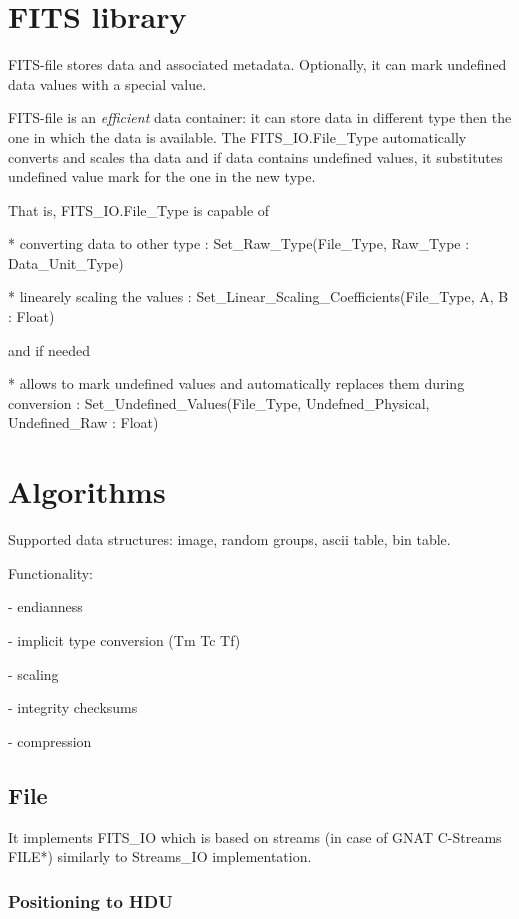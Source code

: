 \documentclass[a4paper,10pt]{article}
\begin{document}
\tableofcontents

\section{FITS library}

FITS-file stores data and associated metadata. Optionally, it can mark undefined
data values with a special value.

FITS-file is an \textit{efficient} data container:
it can store data in different type then the one in which the data is available.
The FITS\_IO.File\_Type automatically converts and scales tha data and if data
contains undefined values, it substitutes undefined value mark for the one in the new type.


That is, FITS\_IO.File\_Type is capable of

* converting data to other type : Set\_Raw\_Type(File\_Type, Raw\_Type : Data\_Unit\_Type)

* linearely scaling the values : Set\_Linear\_Scaling\_Coefficients(File\_Type, A, B : Float)

and if needed

* allows to mark undefined values and automatically replaces them during conversion
: Set\_Undefined\_Values(File\_Type, Undefned\_Physical, Undefined\_Raw : Float)



\section{Algorithms}

Supported data structures: image, random groups, ascii table, bin table.

Functionality:

- endianness

- implicit type conversion (Tm Tc Tf)

- scaling

- integrity checksums

- compression



\subsection{File}
It implements FITS\_IO which is based on streams (in case of GNAT C-Streams FILE*) similarly to Streams\_IO implementation.



\subsubsection{Positioning to HDU}
\end{document}
